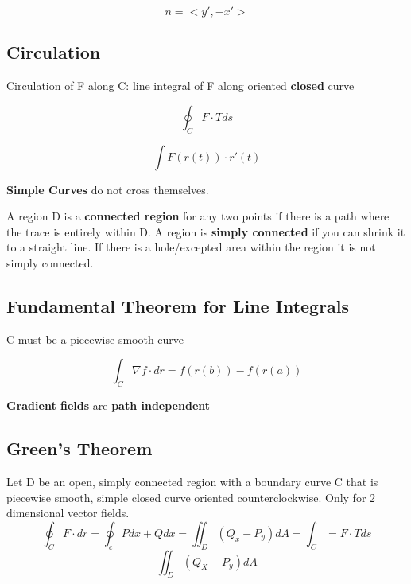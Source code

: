 \begin{equation}
	\label{}
n=<y',-x'>	
\end{equation}

\subsection{Circulation}
Circulation of F along C: line integral of F along oriented \textbf{closed} curve

\begin{equation}
	\label{}
\oint_{C}F\cdot T ds	
\end{equation}

\begin{equation}
	\label{}
\int F(r(t))\cdot r'(t)	
\end{equation}

\textbf{Simple Curves} do not cross themselves.

A region D is a \textbf{connected region} for any two points if there is a path where the trace is entirely within D. A region is \textbf{simply connected} if you can shrink it to a straight line. If there is a hole/excepted area within the region it is not simply connected.

\subsection{Fundamental Theorem for Line Integrals}
C must be a piecewise smooth curve

\begin{equation}
	\label{}
\int_{C}\nabla f \cdot dr = f(r(b))-f(r(a))	
\end{equation}


\textbf{Gradient fields} are \textbf{path independent}

\subsection{Green's Theorem}

Let D be an open, simply connected region with a boundary curve C that is piecewise smooth, simple closed curve oriented counterclockwise. Only for 2 dimensional vector fields.
\begin{equation}
	\label{}
	\oint_{C}F\cdot dr = \oint_{c}Pdx+Qdx = \iint_{D}(Q_{x}-P_{y})dA=\int_{C}=F\cdot T ds
\end{equation}
\begin{equation}
	\label{}
\iint_{D}(Q_{X}-P_{y})dA	
\end{equation}

